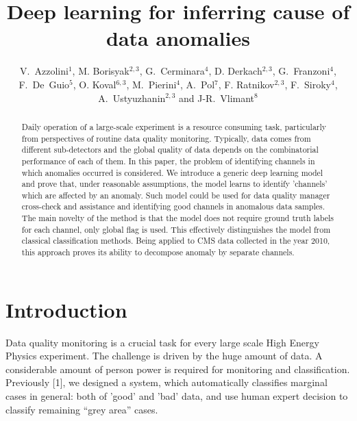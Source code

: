 \documentclass[a4paper]{jpconf}
\begin{document}
\title{Deep learning for inferring cause of data anomalies}

\author{V.~Azzolini$^1$, M. Borisyak$^{2,3}$, G.~Cerminara$^4$, D. Derkach$^{2,3}$, G.~Franzoni$^4$, F.~De~Guio$^5$, O. Koval$^{6,3}$, M.~Pierini$^4$, A.~Pol$^7$, F. Ratnikov$^{2,3}$, F.~Siroky$^4$, A.~Ustyuzhanin$^{2,3}$ and J-R.~Vlimant$^8$}

\address{$^1$ Massachusetts Institute of Technology, Cambridge, USA \\
$^2$ National Research University Higher School of Economics,  Moscow, Russia \\
$^3$ Yandex School of Data Analysis, Moscow, Russia \\
$^4$ CERN, European Organization for Nuclear Research, Geneva, Switzerland \\
$^5$ Texas Tech University, Lubbock, USA \\
$^6$ Skolkovo Institute of Science and Technology, Moscow, Russia \\
$^7$ University of Paris-Saclay, Paris, France \\
$^8$ California Institute of Technology, Pasadena, USA}



\begin{abstract} 
Daily operation of a large-scale experiment is a resource consuming task, particularly from perspectives of routine data quality monitoring. Typically, data comes from different sub-detectors and the global quality of data depends on the combinatorial performance of each of them. In this paper, the problem of identifying channels in which anomalies occurred is considered.
We introduce a generic deep learning model and prove that, under reasonable assumptions, the model learns to identify 'channels' which are affected by an anomaly. Such model could be used for data quality manager cross-check and assistance and identifying good channels in anomalous data samples.
The main novelty of the method is that the model does not require ground truth labels for each channel, only global flag is used. This effectively distinguishes the model from classical classification methods. Being applied to CMS data collected in the year 2010,  this approach proves its ability to decompose anomaly by separate channels. 
\end{abstract}




\section{Introduction}
Data quality monitoring is a crucial task for every large scale High Energy Physics experiment.
The challenge is driven by the huge amount of data. A considerable amount of person power is required for monitoring and classification. Previously [1], we designed a system, which automatically classifies marginal cases in general: both of 'good' and 'bad' data, and use human expert decision to classify remaining “grey area” cases. 
\end{document}

